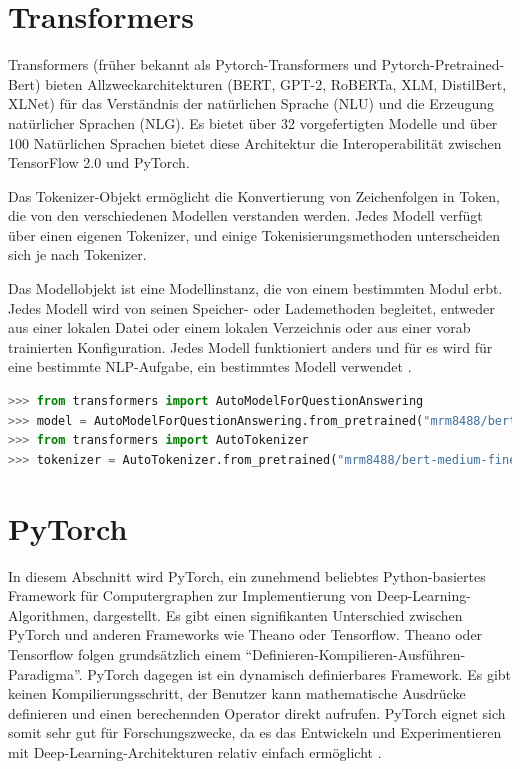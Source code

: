 \documentclass[
        ngerman,
        paper=a4,
        numbers=noendperiod,
]{scrreprt}
\begin{document}
\section{Transformers}
Transformers (früher bekannt als Pytorch-Transformers und Pytorch-Pretrained-Bert) bieten Allzweckarchitekturen (BERT, GPT-2, RoBERTa, XLM, DistilBert, XLNet) für das Verständnis der natürlichen Sprache (NLU) und die Erzeugung natürlicher Sprachen (NLG). Es bietet über 32 vorgefertigten Modelle und über 100 Natürlichen Sprachen bietet diese Architektur die Interoperabilität zwischen TensorFlow 2.0 und PyTorch.

Das Tokenizer-Objekt ermöglicht die Konvertierung von Zeichenfolgen in Token, die von den verschiedenen Modellen verstanden werden. Jedes Modell verfügt über einen eigenen Tokenizer, und einige Tokenisierungsmethoden unterscheiden sich je nach Tokenizer.

Das Modellobjekt ist eine Modellinstanz, die von einem bestimmten Modul erbt. Jedes Modell wird von seinen Speicher- oder Lademethoden begleitet, entweder aus einer lokalen Datei oder einem lokalen Verzeichnis oder aus einer vorab trainierten Konfiguration. Jedes Modell funktioniert anders und für es wird für eine bestimmte NLP-Aufgabe, ein bestimmtes Modell verwendet \citep{TransformersDocumentation}\citep{PyTorch-TransformersPyTorch}.

\begin{lstlisting}[language=Python, caption=Transformers Beispiel]
>>> from transformers import AutoModelForQuestionAnswering
>>> model = AutoModelForQuestionAnswering.from_pretrained("mrm8488/bert-medium-finetuned-squadv2")
>>> from transformers import AutoTokenizer
>>> tokenizer = AutoTokenizer.from_pretrained("mrm8488/bert-medium-finetuned-squadv2")
\end{lstlisting}

\section{PyTorch}
In diesem Abschnitt wird PyTorch, ein zunehmend beliebtes Python-basiertes Framework für Computergraphen zur Implementierung von Deep-Learning-Algorithmen, dargestellt. Es gibt einen signifikanten Unterschied zwischen PyTorch und anderen Frameworks wie Theano oder Tensorflow. Theano oder Tensorflow folgen grundsätzlich einem \enquote{Definieren-Kompilieren-Ausführen-Paradigma}. PyTorch dagegen ist ein dynamisch definierbares Framework. Es gibt keinen Kompilierungsschritt, der Benutzer kann mathematische Ausdrücke definieren und einen berechennden Operator direkt aufrufen. PyTorch eignet sich somit sehr gut für Forschungszwecke, da es das Entwickeln und Experimentieren mit Deep-Learning-Architekturen relativ einfach ermöglicht \citep[S. 195]{Ketkar2017}.
\end{document}
